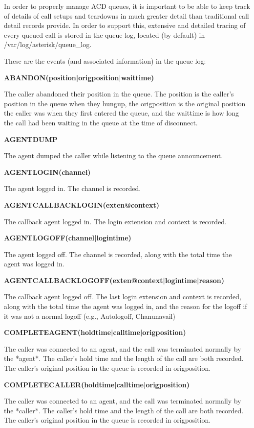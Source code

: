 In order to properly manage ACD queues, it is important to be able to
keep track of details of call setups and teardowns in much greater detail
than traditional call detail records provide.  In order to support this,
extensive and detailed tracing of every queued call is stored in the
queue log, located (by default) in /var/log/asterisk/queue\_log.

These are the events (and associated information) in the queue log:

\textbf{ABANDON(position|origposition|waittime)}

The caller abandoned their position in the queue.  The position is the
caller's position in the queue when they hungup, the origposition is
the original position the caller was when they first entered the
queue, and the waittime is how long the call had been waiting in the 
queue at the time of disconnect.

\textbf{AGENTDUMP}

The agent dumped the caller while listening to the queue announcement.

\textbf{AGENTLOGIN(channel)}

The agent logged in.  The channel is recorded.

\textbf{AGENTCALLBACKLOGIN(exten@context)}

The callback agent logged in.  The login extension and context is recorded.

\textbf{AGENTLOGOFF(channel|logintime)}

The agent logged off.  The channel is recorded, along with the total time
the agent was logged in.

\textbf{AGENTCALLBACKLOGOFF(exten@context|logintime|reason)}

The callback agent logged off.  The last login extension and context is
recorded, along with the total time the agent was logged in, and the
reason for the logoff if it was not a normal logoff 
(e.g., Autologoff, Chanunavail)

\textbf{COMPLETEAGENT(holdtime|calltime|origposition)}

The caller was connected to an agent, and the call was terminated normally
by the *agent*.  The caller's hold time and the length of the call are both
recorded.  The caller's original position in the queue is recorded in
origposition.

\textbf{COMPLETECALLER(holdtime|calltime|origposition)}

The caller was connected to an agent, and the call was terminated normally
by the *caller*.  The caller's hold time and the length of the call are both
recorded.  The caller's original position in the queue is recorded in
origposition.

